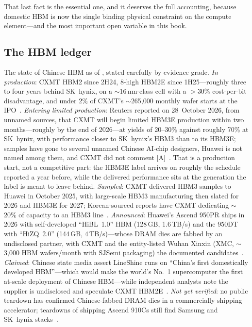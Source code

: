 That last fact is the essential one, and it deserves the full accounting, because domestic HBM is now the single binding physical constraint on the compute element---and the most important open variable in this book.

\subsection{The HBM ledger}
\label{sec:hbm-ledger}

The state of Chinese HBM as of \datafreeze, stated carefully by evidence grade. \emph{In production}: CXMT HBM2 since 2H24, 8-high HBM2E since 1H25---roughly three to four years behind SK~hynix, on a $\sim$16\,nm-class cell with a $>$30\% cost-per-bit disadvantage, and under 2\% of CXMT's $\sim$265,000 monthly wafer starts at the IPO~\cite{chinatalk-hbm,cxmt-ipo}. \emph{Entering limited production}: Reuters reported on 28~October 2026, from unnamed sources, that CXMT will begin limited HBM3E production within two months---roughly by the end of 2026---at yields of 20--30\% against roughly 70\% at SK~hynix, with performance closer to SK~hynix's HBM3 than to its HBM3E; samples have gone to several unnamed Chinese AI-chip designers, Huawei is not named among them, and CXMT did not comment [A]~\cite{hw-cxmt-hbm3e}. That is a production start, not a competitive part: the HBM3E label arrives on roughly the schedule reported a year before, while the delivered performance sits at the generation the label is meant to leave behind. \emph{Sampled}: CXMT delivered HBM3 samples to Huawei in October 2025, with large-scale HBM3 manufacturing then slated for 2026 and HBM3E for 2027; Korean-sourced reports have CXMT dedicating $\sim$20\% of capacity to an HBM3 line~\cite{cxmt-hbm3}. \emph{Announced}: Huawei's Ascend 950PR ships in 2026 with self-developed ``HiBL~1.0'' HBM (128\,GB, 1.6\,TB/s) and the 950DT with ``HiZQ~2.0'' (144\,GB, 4\,TB/s)---whose DRAM dies are fabbed by an undisclosed partner, with CXMT and the entity-listed Wuhan Xinxin (XMC, $\sim$3,000 HBM wafers/month with SJSemi packaging) the documented candidates~\cite{huawei-roadmap,xmc-hbm}. \emph{Claimed}: Chinese state media assert LineShine runs on ``China's first domestically developed HBM''---which would make the world's No.~1 supercomputer the first at-scale deployment of Chinese HBM---while independent analysts note the supplier is undisclosed and speculate CXMT HBM2E~\cite{globaltimes-lineshine,lockwood}. \emph{Not yet verified}: no public teardown has confirmed Chinese-fabbed DRAM dies in a commercially shipping accelerator; teardowns of shipping Ascend 910Cs still find Samsung and SK~hynix stacks~\cite{hbm-teardown}.

